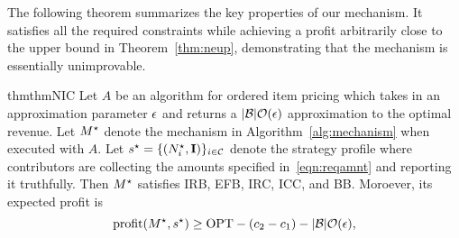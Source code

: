 



\vspace{0.06in}
\noindent
The following theorem summarizes the key properties of our mechanism. It satisfies all the required constraints while achieving a profit arbitrarily close to the upper bound in Theorem~\ref{thm:neup}, demonstrating that the mechanism is essentially unimprovable.  

\begin{restatable}{thm}{thmNIC} \label{thm:multi_thm}
    Let $A$ be an algorithm for ordered item pricing which takes in an approximation parameter $\epsilon$ and returns a $|\mathcal{B}|\mathcal{O}(\epsilon)$ approximation to the optimal revenue.
    Let $M^\star$ denote the mechanism in Algorithm~\ref{alg:mechanism} when executed with $A$.
    Let $s^\star = \{(N^\star_i, {\rm \bf I})\}_{i\in \mathcal{C}}$ denote the strategy profile where contributors are collecting the amounts specified in~\eqref{eqn:reqamnt} and reporting it truthfully.
    Then $M^\star$ satisfies IRB, EFB, IRC, ICC, and BB.
    Moroever, its expected profit is
    \[
    {\rm profit}(M^\star, s^\star) \geq {\rm OPT} - (c_2 - c_1) - |\mathcal{B}|\mathcal{O}(\epsilon),
    \]
\end{restatable}

